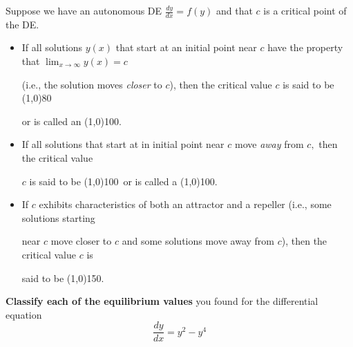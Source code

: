 \documentclass[12pt]{article}
\newcommand{\ds}{\displaystyle}
\newcommand{\<}{\langle}
\renewcommand{\>}{\rangle}
\def\ds{\displaystyle}
\begin{document}
\begin{enumerate}
		Suppose we have an autonomous DE $\ds \frac{dy}{dx} = f(y)$ and that $c$ is 
		a critical point of the DE.
		\begin{itemize}
			\item If all solutions $y(x)$ that start at an initial point near $c$ have the property that $\ds \lim_{x \to \infty} y(x) = c$
			
			\medskip

			(i.e., the solution moves {\it closer} to $c$), then the critical value $c$ is said to be \line(1,0){80}

			\medskip

			or is called an \line(1,0){100}.%
			\medskip

			\item If all solutions that start at in initial point near $c$ move {\it away} from $c,$ then the critical value
			
			\medskip
			
			$c$ is said to be \line(1,0){100}\, or is called a \line(1,0){100}. %

			\medskip

			\item If $c$ exhibits characteristics of both an attractor and a repeller (i.e., some solutions starting 
			
			\medskip

			near $c$ move closer to $c$ and some solutions move away from $c$), then the critical value $c$ is 
			
			\medskip

			said to be \line(1,0){150}. %
			
			\medskip

		\end{itemize}
			
		{\bf Classify each of the equilibrium values} you found for the differential equation
		\[\frac{dy}{dx} = y^2 - y^4\]
	\end{enumerate}
\end{document}
